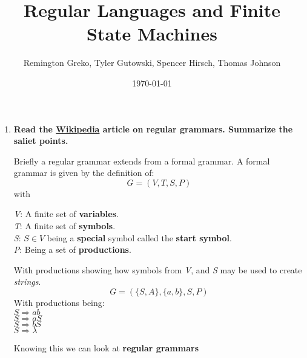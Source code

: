 \documentclass{article}
\begin{document}
\title{Regular Languages and Finite State Machines}
\author{Remington Greko, Tyler Gutowski, Spencer Hirsch, Thomas Johnson}
\date{\today}

\maketitle

\begin{enumerate}
    \item \textbf{Read the \href{https://en.wikipedia.org/wiki/Regular_grammar}{Wikipedia} article on regular grammars. Summarize
            the saliet points.}

    \medskip

    \-\hspace{0.5cm} Briefly a regular grammar extends from a formal grammar. A formal grammar is given 
    by the definition of:
    \[G = (V, T, S, P)\]
    with
    
    \smallskip

    \-\hspace{0.5cm} \textit{V}: A finite set of \textbf{variables}. \\
    \-\hspace{0.5cm} \textit{T}: A finite set of \textbf{symbols}.  \\
    \-\hspace{0.5cm} \textit{S}: $S \in V$ being a \textbf{special} symbol called the \textbf{start symbol}.    \\
    \-\hspace{0.5cm} \textit{P}: Being a set of \textbf{productions}. 

    \-\hspace{0.5cm} With productions showing how symbols from \textit{V}, and \textit{S} may be used to create \textit{strings}.
    \[G = (\{S, A\}, \{a, b\}, S, P)\]
    \-\hspace{0.5cm} With productions being: \\
    \-\hspace{1.0cm} $S \Rightarrow ab$ \\
    \-\hspace{1.0cm} $S \Rightarrow aS$ \\
    \-\hspace{1.0cm} $S \Rightarrow bS$ \\
    \-\hspace{1.0cm} $S \Rightarrow \lambda$

    \-\hspace{0.5cm} Knowing this we can look at \textbf{regular grammars}


\end{enumerate}
\end{document}
